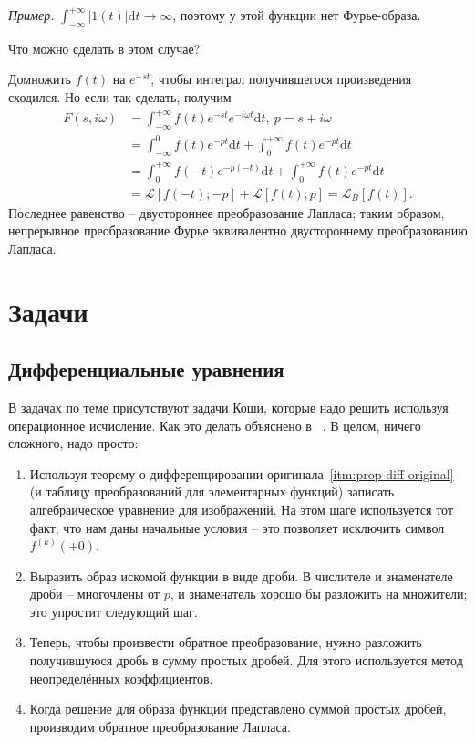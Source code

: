 \documentclass[12pt]{report}
\renewcommand{\L}{\mathcal L}
\newcommand{\rd}{\mathrm d}
\renewcommand{\i}{i}
\begin{document}
\emph{Пример.} $\int_{-\infty}^{+\infty} |1(t)| \rd t \to \infty$, поэтому у этой функции нет Фурье-образа.

Что можно сделать в этом случае? 

Домножить $f(t)$ на $e^{-st}$, чтобы интеграл получившегося произведения сходился.
Но если так сделать, получим 
\begin{align*}
F(s,\i\omega) &= \int_{-\infty}^{+\infty}f(t)e^{-st}e^{-\i\omega t}\rd t, ~ p = s + \i\omega  \\
&= \int_{-\infty}^0 f(t) e^{-pt}\rd t + \int_0^{+\infty} f(t) e^{-pt}\rd t \\
&= \int_0^{+\infty} f(-t) e^{-p(-t)}\rd t + \int_0^{+\infty} f(t) e^{-pt}\rd t \\
&= \L[f(-t); -p] + \L[f(t); p] = \L_B[f(t)].
\end{align*}
Последнее равенство -- двустороннее преобразование Лапласа; таким образом, непрерывное преобразование Фурье эквивалентно двустороннему преобразованию Лапласа.

\section{Задачи}
\subsection{Дифференциальные уравнения}
В задачах по теме присутствуют задачи Коши, которые надо решить используя операционное исчисление. Как это делать объяснено в ~\cite{difur}. В целом, ничего сложного, надо просто: 
\begin{enumerate}
	\item Используя теорему о дифференцировании оригинала~\ref{itm:prop-diff-original} (и таблицу преобразований для элементарных функций) записать алгебраическое уравнение для изображений. На этом шаге используется тот факт, что нам даны начальные условия -- это позволяет исключить символ $f^{(k)}(+0)$.
	\item Выразить образ искомой функции в виде дроби. В числителе и знаменателе дроби -- многочлены от $p$, и знаменатель хорошо бы разложить на множители; это упростит следующий шаг.
	\item Теперь,  чтобы произвести обратное преобразование, нужно разложить получившуюся дробь в сумму простых дробей. Для этого используется метод неопределённых коэффициентов.~\cite{indefinite-coef-method}
	\item Когда решение для образа функции представлено суммой простых дробей, производим обратное преобразование Лапласа. 
\end{enumerate}
\end{document}
